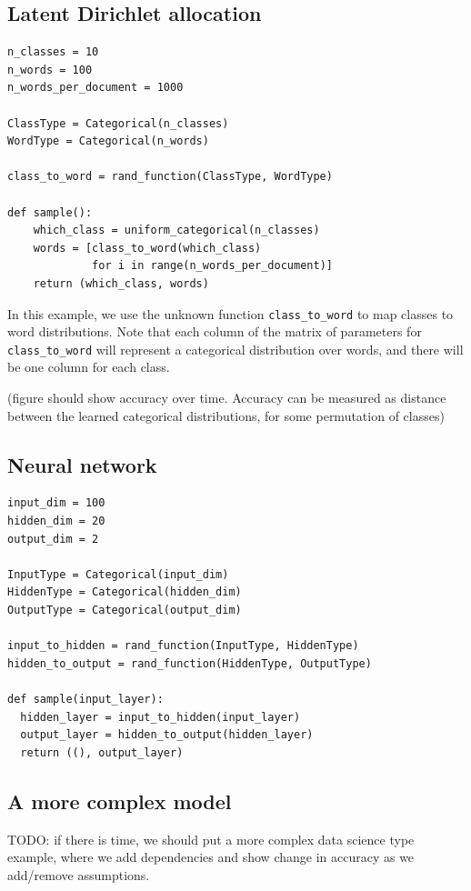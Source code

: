 \documentclass{article}
\begin{document}
\subsection{Latent Dirichlet allocation}
{\small
\begin{verbatim}
n_classes = 10
n_words = 100
n_words_per_document = 1000

ClassType = Categorical(n_classes)
WordType = Categorical(n_words)

class_to_word = rand_function(ClassType, WordType)

def sample():
    which_class = uniform_categorical(n_classes)
    words = [class_to_word(which_class)
             for i in range(n_words_per_document)]
    return (which_class, words)
\end{verbatim}
}

In this example, we use the unknown function \texttt{class\_to\_word} to map classes to word distributions.  Note that each column of the matrix of parameters for \texttt{class\_to\_word} will represent a categorical distribution over words, and there will be one column for each class.

(figure should show accuracy over time.  Accuracy can be measured as distance between the learned categorical distributions, for some permutation of classes)

\subsection{Neural network}

{\small
\begin{verbatim}
input_dim = 100
hidden_dim = 20
output_dim = 2

InputType = Categorical(input_dim)
HiddenType = Categorical(hidden_dim)
OutputType = Categorical(output_dim)

input_to_hidden = rand_function(InputType, HiddenType)
hidden_to_output = rand_function(HiddenType, OutputType)

def sample(input_layer):
  hidden_layer = input_to_hidden(input_layer)
  output_layer = hidden_to_output(hidden_layer)
  return ((), output_layer)
\end{verbatim}
}

\subsection{A more complex model}

TODO: if there is time, we should put a more complex data science type example, where we add dependencies and show change in accuracy as we add/remove assumptions.
\end{document}
